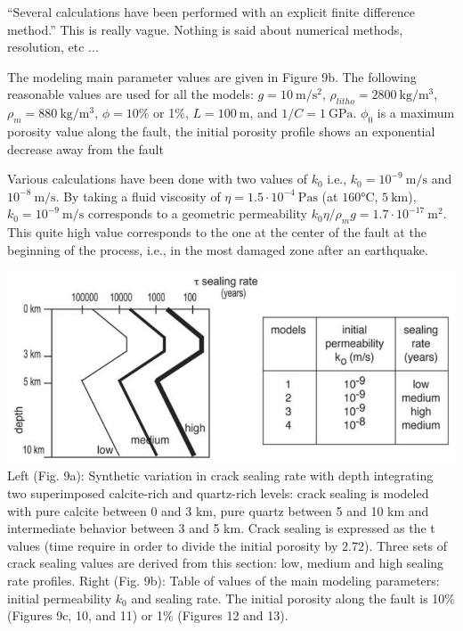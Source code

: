 ``Several calculations have been performed with an
explicit finite difference method.''
This is really vague. Nothing is said about numerical methods, 
resolution, etc ... 

The modeling main
parameter values are given in Figure 9b.
The following reasonable values are used for all the models:
$g=10~\si{\meter\per\square\second}$, $\rho_{litho}=2800~\si{\kg\per\cubic\meter}$, 
$\rho_m=880~\si{\kg\per\cubic\meter}$, $\phi=10\%$ or 1\%,
$L=100~\si{\meter}$, and $1/C=1~\si{\giga\pascal}$.
$\phi_0$ is a maximum porosity value along the fault, the initial porosity profile shows an
exponential decrease away from the fault

Various calculations have been done with two values of $k_0$
i.e., $k_0 = 10^{-9}~\si{\meter\per\second}$ and $10^{-8}~\si{\meter\per\second}$. By taking a fluid
viscosity of $\eta= 1.5 \cdot 10^{-4}~\si{\pascal\second}$ (at $160\si{\celsius}$, $5~\si{\kilo\meter}$), 
$k_0= 10^{-9}~\si{\meter\per\second}$ corresponds to a geometric permeability 
$k_0 \eta/\rho_m g =1.7 \cdot 10^{-17}~\si{\square\meter}$. This quite high value corresponds to the
one at the center of the fault at the beginning of the process,
i.e., in the most damaged zone after an earthquake.

\begin{center}
\includegraphics[width=15cm]{python_codes/fieldstone_126/images/grfr03a}\\
{\captionfont 
Left (Fig. 9a): Synthetic variation
in crack sealing rate with depth integrating two superimposed calcite-rich and quartz-rich levels: crack
sealing is modeled with pure calcite between 0 and 3 km, pure quartz between 5 and 10 km and
intermediate behavior between 3 and 5 km. Crack sealing is expressed as the t values (time require in
order to divide the initial porosity by 2.72). Three sets of crack sealing values are derived from this
section: low, medium and high sealing rate profiles.
Right (Fig. 9b): Table of values of the main modeling parameters:
initial permeability $k_0$ and sealing rate. 
The initial porosity along the fault is 10\% (Figures 9c, 10, and 11) or 1\% (Figures 12 and 13).}
\end{center}


